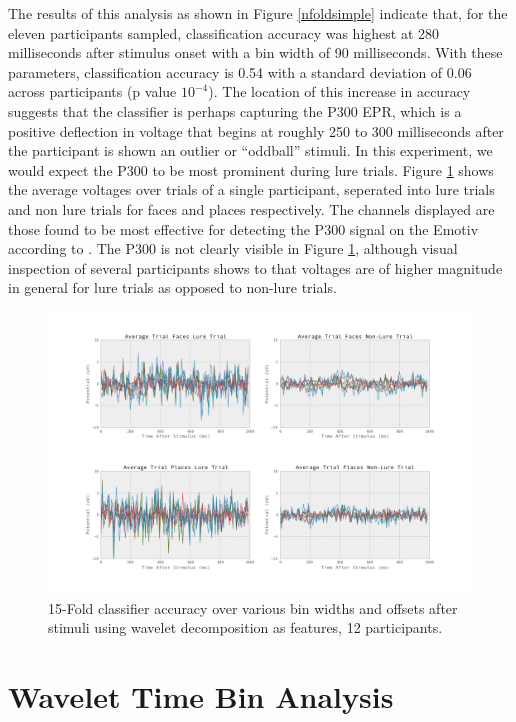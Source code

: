 \documentclass[12pt]{report}
\begin{document}
	The results of this analysis as shown in Figure \ref{nfoldsimple} indicate that, for the eleven participants sampled, classification accuracy was highest at 280 milliseconds after stimulus onset with a bin width of 90 milliseconds.  With these parameters, classification accuracy is 0.54 with a standard deviation of 0.06 across participants (p value $10^{-4}$).  The location of this increase in accuracy suggests that the classifier is perhaps capturing the P300 EPR, which is a positive deflection in voltage that begins at roughly 250 to 300 milliseconds after the participant is shown an outlier or ``oddball'' stimuli\cite{p300}.  In this experiment, we would expect the P300 to be most prominent during lure trials.  Figure \ref{luresvsnonlures300} shows the average voltages over trials of a single participant, seperated into lure trials and non lure trials for faces and places respectively.  The channels displayed are those found to be most effective for detecting the P300 signal on the Emotiv according to \cite{Ekanayake}.  The P300 is not clearly visible in Figure \ref{luresvsnonlures300}, although visual inspection of several participants shows to that voltages are of higher magnitude in general for lure trials as opposed to non-lure trials.  

     
\begin{figure}[t]
\centerline{
\includegraphics[width=7in]{lurevsnonlurep300}
}
\caption{15-Fold classifier accuracy over various bin widths and offsets after stimuli using wavelet decomposition as features, 12 participants.\label{luresvsnonlures300}}
\end{figure}

\section{Wavelet Time Bin Analysis}
\end{document}
